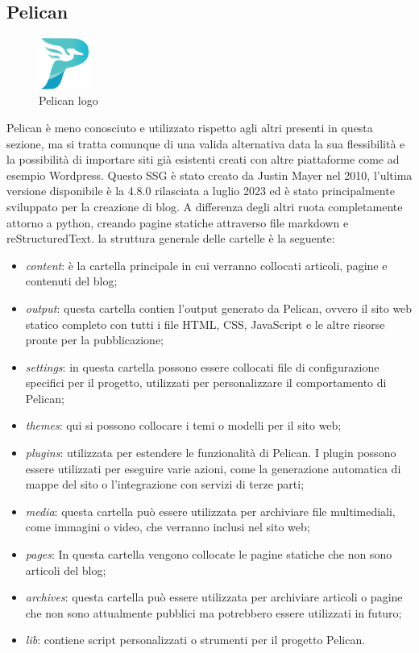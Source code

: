 \documentclass[target=bach,aauheader=]{thud}
\begin{document}
\subsection{Pelican}

\begin{figure}
    \centering
    \includegraphics[width = 0.15\textwidth]{images/pelican_logo.png}
    \caption{Pelican logo}
\end{figure}

Pelican è meno conosciuto e utilizzato rispetto agli altri presenti in questa sezione, ma si tratta comunque di una valida alternativa data la sua flessibilità e la possibilità di importare siti già esistenti creati con altre piattaforme come ad esempio Wordpress.
Questo SSG è stato creato da Justin Mayer nel 2010, l'ultima versione disponibile è la 4.8.0 rilasciata a luglio 2023 ed è stato principalmente sviluppato per la creazione di blog.  
A differenza degli altri ruota completamente attorno a python, creando pagine statiche attraverso file markdown e reStructuredText. \newline
la struttura generale delle cartelle è la seguente: 
\begin{itemize}
    \item \textit{content}: è la cartella principale in cui verranno collocati articoli, pagine e contenuti del blog;
    \item \textit{output}: questa cartella contien l'output generato da Pelican, ovvero il sito web statico completo con tutti i file HTML, CSS, JavaScript e le altre risorse pronte per la pubblicazione;
    \item \textit{settings}: in questa cartella possono essere collocati file di configurazione specifici per il progetto, utilizzati per personalizzare il comportamento di Pelican;
    \item \textit{themes}: qui si possono collocare i temi o modelli per il sito web;
    \item \textit{plugins}: utilizzata per estendere le funzionalità di Pelican. I plugin possono essere utilizzati per eseguire varie azioni, come la generazione automatica di mappe del sito o l'integrazione con servizi di terze parti;
    \item \textit{media}: questa cartella può essere utilizzata per archiviare file multimediali, come immagini o video, che verranno inclusi nel sito web;
    \item \textit{pages}: In questa cartella vengono collocate le pagine statiche che non sono articoli del blog;
    \item \textit{archives}: questa cartella può essere utilizzata per archiviare articoli o pagine che non sono attualmente pubblici ma potrebbero essere utilizzati in futuro;
    \item \textit{lib}: contiene script personalizzati o strumenti per il progetto Pelican.
\end{itemize}
\end{document}
